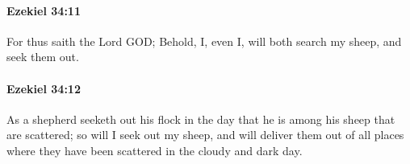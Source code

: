 		\paragraph{Ezekiel 34:11} %
			\label{EZEKIEL-34-11}

			For thus saith the Lord GOD; Behold, I, even I, will both search my sheep, and seek them out.


		\paragraph{Ezekiel 34:12} %
			\label{EZEKIEL-34-12}

			As a shepherd seeketh out his flock in the day that he is among his sheep that are scattered; so will I seek out my sheep, and will deliver them out of all places where they have been scattered in the cloudy and dark day.



